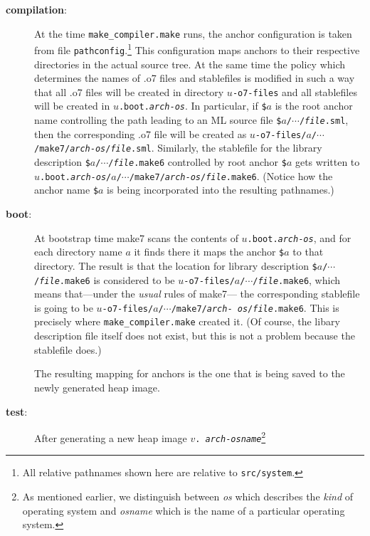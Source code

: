 \begin{description}
\item[{\bf compilation}:]
At the time {\tt make_compiler.make} runs, the anchor configuration is taken
from file {\tt pathconfig}.\footnote{All relative pathnames shown here
are relative to {\tt src/system}.}  This configuration maps anchors to
their respective directories in the actual source tree.  At the same
time the policy which determines the names of .o7 files
and stablefiles is modified in such a way that all .o7 files will be
created in directory {\tt $u$-o7-files} and all
stablefiles will be created in {\tt $u$.boot.{\it arch}-{\it os}}.
In particular, if {\tt \$$a$} is the root anchor name controlling
the path leading to an ML source file
{\tt \$$a$/$\cdots$/{\it file}.sml},
then the corresponding .o7 file will be created as
{\tt $u$-o7-files/$a$/$\cdots$/make7/{\it arch}-{\it os}/{\it file}.sml}.
Similarly, the stablefile for the library description
{\tt \$$a$/$\cdots$/{\it file}.make6} controlled by root anchor {\tt \$$a$}
gets written to
{\tt $u$.boot.{\it arch}-{\it os}/$a$/$\cdots$/make7/{\it arch}-{\it os}/{\it file}.make6}.
(Notice how the anchor name {\tt \$$a$} is being incorporated into the
resulting pathnames.)
\item[{\bf boot}:]
At bootstrap time make7
scans the contents of {\tt $u$.boot.{\it arch}-{\it os}}, and for
each directory name $a$ it finds there it maps the anchor {\tt \$$a$} to that
directory.  The result is that the location for library description
{\tt \$$a$/$\cdots$/{\it file}.make6}
is considered to be
{\tt $u$-o7-files/$a$/$\cdots$/{\it file}.make6}, which
means that---under the {\em usual} rules of make7---
the corresponding stablefile is going to be
{\tt $u$-o7-files/$a$/$\cdots$/make7/{\it arch}-{\it
os}/{\it file}.make6}.  This is precisely where {\tt make_compiler.make} created
it.  (Of course, the libary description file itself does not exist,
but this is not a problem because the stablefile does.)

The resulting mapping for anchors is the one that is being saved to the
newly generated heap image.
\item[{\bf test}:] After generating a new heap image {\tt $v$.{\it
arch}-{\it osname}}\footnote{As mentioned earlier, we distinguish
between {\it os} which describes the {\em kind} of operating system
and {\it osname} which is the name of a particular operating system.

}
\end{description}

